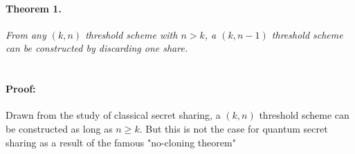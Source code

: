 \documentclass[12pt]{article}
\begin{document}
\paragraph{Theorem 1.}
\textit{From any $(k,n)$ threshold scheme with $n > k$, a $(k, n-1)$ threshold scheme can be constructed by discarding one share.} \\\\
\paragraph{Proof:} Drawn from the study of classical secret sharing, a $(k,n)$ threshold scheme can be constructed as long as $n \ge k$. But this is not the case for quantum secret sharing as a result of the famous "no-cloning theorem"














	





\end{document}
